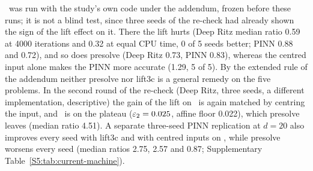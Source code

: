 \Paltridge\ was run with the study's own code under the addendum, frozen before these runs; it is
not a blind test, since three seeds of the re-check had already shown the sign of the lift effect
on it. There the lift hurts (Deep Ritz median ratio 0.59 at 4000 iterations and 0.32 at equal CPU
time, 0 of 5 seeds better; PINN 0.88 and 0.72), and so does presolve (Deep Ritz 0.73, PINN 0.83),
whereas the centred input alone makes the PINN more accurate (1.29, 5 of 5). By the extended rule
of the addendum neither presolve nor lift3c is a general remedy on the five problems.
In the second round of the re-check (Deep Ritz, three seeds, a different implementation,
descriptive) the gain of the lift on \Psinlin\ is again matched by centring the input, and
\Pexpcos\ is on the plateau ($\varepsilon_{2}=0.025$, affine floor 0.022), which presolve leaves (median
ratio 4.51). A separate three-seed PINN replication at $d=20$ also improves every seed with
lift3c and with centred inputs on \Psinlin, while presolve worsens every seed (median ratios
2.75, 2.57 and 0.87; Supplementary Table~\ref{S5:tab:current-machine}).

